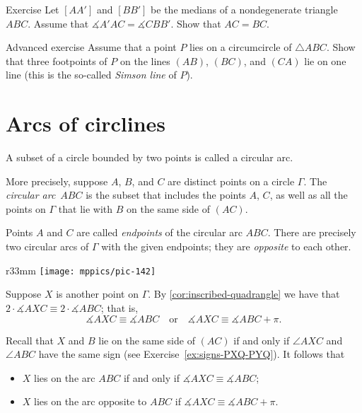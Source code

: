 \begin{thm}{Exercise}\label{ex:median-angle}
Let $[AA']$ and $[BB']$ be the medians of a nondegenerate triangle $ABC$.
Assume that $\measuredangle A'AC = \measuredangle CBB'$.
Show that $AC = BC$.
\end{thm}


\begin{thm}{Advanced exercise}\label{ex:simson}
Assume that a point $P$ lies on a circumcircle of $\triangle ABC$.
Show that three footpoints of $P$ on the lines $(AB)$, $(BC)$, and $(CA)$ lie on one line
(this is the so-called \emph{Simson line} of $P$).
\end{thm}

\section{Arcs of circlines}

A subset of a circle bounded by two points is called a circular arc.

More precisely,
suppose $A$, $B$, and $C$ are distinct points on a circle $\Gamma$.
The \emph{circular arc}~$ABC$ is the subset that includes the points $A$, $C$,
as well as all the points on $\Gamma$ that lie with $B$ on the same side of $(AC)$.

Points $A$ and $C$ are called 
\emph{endpoints} of the circular arc $ABC$. 
There are precisely two circular arcs of $\Gamma$ with the given endpoints; they are \emph{opposite} to each other.

\begin{wrapfigure}[7]{r}{33mm}
\vskip-6mm
\centering
\texttt{[image: mppics/pic-142]}
\end{wrapfigure}

Suppose $X$ is another point on $\Gamma$.
By \ref{cor:inscribed-quadrangle} we have
that $2\cdot\measuredangle AXC\equiv 2\cdot\measuredangle ABC$;
that is,
\[\measuredangle AXC\equiv\measuredangle ABC
\quad\text{or}\quad
\measuredangle AXC\equiv\measuredangle ABC+\pi.\]

Recall that $X$ and $B$ lie on the same side of $(AC)$ if and only if $\angle AXC$ and $\angle ABC$ have the same sign (see Exercise~\ref{ex:signs-PXQ-PYQ}).
It follows that 
\begin{itemize}
\item $X$ lies on the arc $ABC$ if and only if $\measuredangle AXC\equiv\measuredangle ABC$;
\item $X$ lies on the arc opposite to $ABC$ if $\measuredangle AXC\equiv\measuredangle ABC+\pi$.
\end{itemize}


